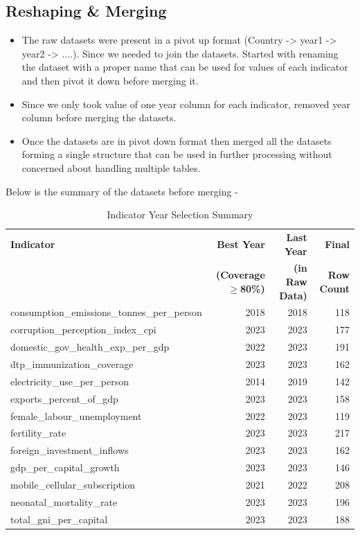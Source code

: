 \documentclass{article}
\begin{document}
\subsection{Reshaping \& Merging}
\begin{itemize}
    \item The raw datasets were present in a pivot up format (Country -> year1 -> year2 -> ....). Since we needed to join the datasets. Started with renaming the dataset with a proper name that can be used for values of each indicator and then pivot it down before merging it.
    \item Since we only took value of one year column for each indicator, removed year column before merging the datasets.
    \item Once the datasets are in pivot down format then merged all the datasets forming a single structure that can be used in further processing without concerned about handling multiple tables.
\end{itemize}
Below is the summary of the datasets before merging - 
\begin{table}[h]
\centering
\label{tab:year_selection}
\begin{tabular}{lrrr}
\toprule
\textbf{Indicator} & \textbf{Best Year} & \textbf{Last Year} & \textbf{Final} \\
 & \textbf{(Coverage $\geq$80\%)} & \textbf{(in Raw Data)} & \textbf{Row Count} \\
\midrule
consumption\_emissions\_tonnes\_per\_person & 2018 & 2018 & 118 \\
corruption\_perception\_index\_cpi & 2023 & 2023 & 177 \\
domestic\_gov\_health\_exp\_per\_gdp & 2022 & 2023 & 191 \\
dtp\_immunization\_coverage & 2023 & 2023 & 162 \\
electricity\_use\_per\_person & 2014 & 2019 & 142 \\
exports\_percent\_of\_gdp & 2023 & 2023 & 158 \\
female\_labour\_unemployment & 2022 & 2023 & 119 \\
fertility\_rate & 2023 & 2023 & 217 \\
foreign\_investment\_inflows & 2023 & 2023 & 162 \\
gdp\_per\_capital\_growth & 2023 & 2023 & 146 \\
mobile\_cellular\_subscription & 2021 & 2022 & 208 \\
neonatal\_mortality\_rate & 2023 & 2023 & 196 \\
total\_gni\_per\_capital & 2023 & 2023 & 188 \\
\bottomrule
\end{tabular}
\caption{Indicator Year Selection Summary}
\end{table}
\end{document}
